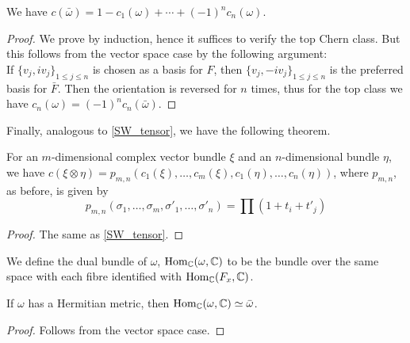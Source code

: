 	\begin{prop}\label{Chern_ori}
		We have $c(\bar{\omega})=1-c_1(\omega)+\cdots+(-1)^nc_n(\omega)$. 
	\end{prop}
	\begin{proof}
		We prove by induction, hence it suffices to verify the top Chern class. But this follows from the vector space case by the following argument: \\
		If $\{v_j,iv_j\}_{1\le j\le n}$ is chosen as a basis for $F$, then $\{v_j,-iv_j\}_{1\le j\le n}$ is the preferred basis for $\bar{F}$. Then the orientation is reversed for $n$ times, thus for the top class we have $c_n(\omega)=(-1)^nc_n(\bar{\omega})$. 
	\end{proof}
	Finally, analogous to \cref{SW_tensor}, we have the following theorem. 
	\begin{thm}\label{Chern_tensor}
		For an $m$-dimensional complex vector bundle $\xi$ and an $n$-dimensional bundle $\eta$, we have $c(\xi\otimes\eta)=p_{m,n}(c_1(\xi),\dots,c_m(\xi),c_1(\eta),\dots,c_n(\eta))$, where $p_{m,n}$, as before, is given by
		\[ p_{m,n}(\sigma_1,\dots,\sigma_m,\sigma'_1,\dots,\sigma'_n)=\prod(1+t_i+t'_j) \]
	\end{thm}
	\begin{proof}
		The same as \cref{SW_tensor}. 
	\end{proof}

	\begin{defn}
		We define the dual bundle of $\omega$, $\operatorname{\mathrm{Hom}}_\mathbb{C}(\omega,\mathbb{C})$ to be the bundle over the same space with each fibre identified with $\operatorname{\mathrm{Hom}}_\mathbb{C}(F_x,\mathbb{C})$. 
	\end{defn}
	\begin{coro}
		If $\omega$ has a Hermitian metric, then $\operatorname{\mathrm{Hom}}_\mathbb{C}(\omega,\mathbb{C})\simeq\bar{\omega}$. 
	\end{coro}
	\begin{proof}
		Follows from the vector space case. 
	\end{proof}

